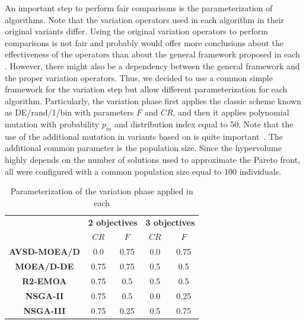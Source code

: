 An important step to perform fair comparisons is the parameterization of algorithms.
%
Note that the variation operators used in each algorithm in their original variants differ.
%
Using the original variation operators to perform comparisons is not fair and probably would offer more conclusions 
about the effectiveness of the operators than about the general framework proposed in each \MOEA{}.
%
However, there might also be a dependency between the general framework and the proper variation operators.
%
Thus, we decided to use a common simple framework for the variation step but allow different parameterization
for each algorithm.
%
Particularly, the variation phase first applies the classic \DE{} scheme known as DE/rand/1/bin with parameters $F$
and $CR$, and then it applies polynomial mutation with probability $p_m$
and distribution index equal to $50$.
%
Note that the use of the additional mutation in variants based on \MOEAD{} is quite important~\cite{zhang2009performance}.
%
The additional common parameter is the population size.
%
Since the hypervolume highly depends on the number of solutions used to approximate the Pareto front,
all \MOEAS{} were configured with a common population size equal to $100$ individuals.
\begin{table}[t]
\centering
\caption{Parameterization of the variation phase applied in each \MOEA{}}
\label{tab:tunning}
\begin{scriptsize}
\begin{tabular}{c|c|c|c|c}
\hline
\multirow{2}{*}{} &\multicolumn{2}{c|}{ \textbf{2 objectives} }& \multicolumn{2}{c}{\textbf{3 objectives} }\\ \cline{2-5} 
 & $CR$ & $F$ & $CR$ & $F$ \\ \hline
\textbf{AVSD-MOEA/D} & 0.0 & 0.75 & 0.0 & 0.75 \\ \hline
\textbf{MOEA/D-DE} & 0.75 & 0.75 & 0.5 & 0.5 \\ \hline
\textbf{R2-EMOA} & 0.75 & 0.5 & 0.5 & 0.5 \\ \hline
\textbf{NSGA-II} & 0.75 & 0.5 & 0.0 & 0.25 \\ \hline
\textbf{NSGA-III} & 0.75 & 0.25 & 0.5 & 0.75 \\ \hline
\end{tabular}%
\end{scriptsize}
\end{table}

